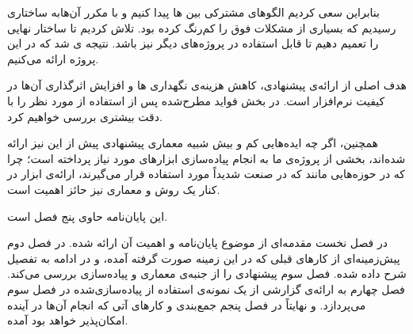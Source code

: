 بنابراین سعی کردیم الگوهای مشترکی بین ‌ها پیدا کنیم و با  مکرر آن‌هابه ساختاری رسیدیم که بسیاری از مشکلات فوق را کم‌رنگ کرده بود. تلاش کردیم تا ساختار نهایی را تعمیم دهیم تا قابل استفاده در پروژه‌های دیگر نیز باشد. نتیجه  ی شد که در این پروژه ارائه می‌کنیم.

هدف اصلی از ارائه‌ی   پیشنهادی، کاهش هزینه‌ی نگهداری ها و افزایش اثرگذاری آن‌ها در کیفیت نرم‌افزار است. در بخش  فواید مطرح‌شده پس از استفاده از  مورد نظر را با دقت بیشتری بررسی خواهیم کرد.

همچنین، اگر چه ایده‌هایی کم و بیش شبیه معماری پیشنهادی پیش از این نیز ارائه شده‌اند، بخشی از پروژه‌ی ما به انجام پیاده‌سازی ابزارهای مورد نیاز پرداخته است؛ چرا که در حوزه‌هایی مانند  که در صنعت شدیداً مورد استفاده قرار می‌گیرند، ارائه‌ی ابزار در کنار یک روش و معماری نیز حائز اهمیت است.


این پایان‌نامه حاوی پنج فصل است.

در فصل نخست مقدمه‌ای از موضوع پایان‌نامه و اهمیت آن ارائه شده. در فصل دوم پیش‌زمینه‌ای از کارهای قبلی که در این زمینه صورت گرفته آمده، و در ادامه  به تفصیل شرح داده شده. فصل سوم   پیشنهادی را از جنبه‌ی معماری و پیاده‌سازی بررسی می‌کند. فصل چهارم به ارائه‌ی گزارشی از یک نمونه‌ی استفاده از  پیاده‌سازی‌شده در فصل سوم می‌پردازد. و نهایتاً در فصل پنجم جمع‌بندی و کارهای آتی که انجام آن‌ها در آینده امکان‌پذیر خواهد بود آمده.


